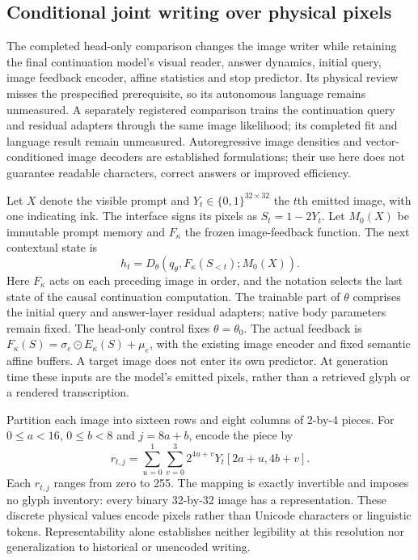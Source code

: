 \subsection*{Conditional joint writing over physical pixels}
The completed head-only comparison changes the image writer while retaining the final
continuation model's visual reader, answer dynamics, initial query, image
feedback encoder, affine statistics and stop predictor. Its physical review
misses the prespecified prerequisite, so its autonomous language remains
unmeasured. A separately registered comparison trains the continuation query
and residual adapters through the same image likelihood; its completed fit
and language result remain unmeasured. Autoregressive image
densities and vector-conditioned image decoders are established
formulations\cite{pixelrnn,pixelcnn}; their use here does not guarantee readable
characters, correct answers or improved efficiency.

Let $X$ denote the visible prompt and $Y_t\in\{0,1\}^{32\times32}$ the $t$th
emitted image, with one indicating ink. The interface signs its pixels as
$S_t=1-2Y_t$. Let $M_0(X)$ be immutable prompt memory and $F_\kappa$ the frozen
image-feedback function. The next contextual state is
\begin{equation}
 h_t=D_\theta\!\left(q_\theta,F_\kappa(S_{<t});M_0(X)\right).
 \label{eq:joint-glyph-history}
\end{equation}
Here $F_\kappa$ acts on each preceding image in order, and the notation selects
the last state of the causal continuation computation. The trainable part of
$\theta$ comprises the initial query and answer-layer residual adapters; native
body parameters remain fixed. The head-only control fixes $\theta=\theta_0$.
The actual feedback is
$F_\kappa(S)=\sigma_e\odot E_\kappa(S)+\mu_e$, with the existing image encoder
and fixed semantic affine buffers. A target image does not enter its own
predictor. At generation time these inputs are the model's
emitted pixels, rather than a retrieved glyph or a rendered transcription.

Partition each image into sixteen rows and eight columns of 2-by-4 pieces.
For $0\leq a<16$, $0\leq b<8$ and $j=8a+b$, encode the piece by
\begin{equation}
 r_{t,j}=\sum_{u=0}^{1}\sum_{v=0}^{3}
       2^{4u+v}Y_t[2a+u,4b+v].
 \label{eq:joint-glyph-packing}
\end{equation}
Each $r_{t,j}$ ranges from zero to 255. The mapping is exactly invertible and
imposes no glyph inventory: every binary 32-by-32 image has a representation.
These discrete physical values encode pixels rather than Unicode characters
or linguistic tokens. Representability alone establishes neither legibility
at this resolution nor generalization to historical or unencoded writing.

